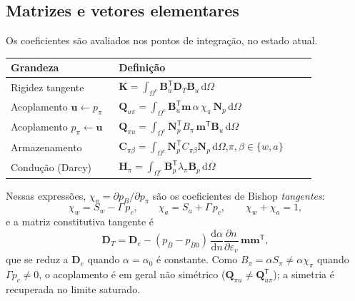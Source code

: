\documentclass[11pt,a4paper]{article}
\newcommand{\dd}{\mathrm{d}}
\begin{document}
\subsection{Matrizes e vetores elementares}

Os coeficientes são avaliados nos pontos de integração, no estado atual.
\begin{center}
\renewcommand{\arraystretch}{1.6}
\begin{tabular}{p{0.30\linewidth}p{0.55\linewidth}}
\toprule
Grandeza & Definição\\
\midrule
Rigidez tangente &
$\mathbf K=\displaystyle\int_{\Omega^e}\mathbf B_u^{\mathsf T}\mathbf D_T\mathbf B_u\,\dd\Omega$\\
Acoplamento $\mathbf u\leftarrow p_\pi$ &
$\mathbf Q_{u\pi}=\displaystyle\int_{\Omega^e}\mathbf B_u^{\mathsf T}\mathbf m\,\alpha\,\chi_\pi\,\mathbf N_p\,\dd\Omega$\\
Acoplamento $p_\pi\leftarrow\mathbf u$ &
$\mathbf Q_{\pi u}=\displaystyle\int_{\Omega^e}\mathbf N_p^{\mathsf T}B_\pi\,\mathbf m^{\mathsf T}\mathbf B_u\,\dd\Omega$\\
Armazenamento &
$\mathbf C_{\pi\beta}=\displaystyle\int_{\Omega^e}\mathbf N_p^{\mathsf T}C_{\pi\beta}\mathbf N_p\,\dd\Omega$,\quad $\pi,\beta\in\{w,a\}$\\
Condução (Darcy) &
$\mathbf H_\pi=\displaystyle\int_{\Omega^e}\mathbf B_p^{\mathsf T}\lambda_\pi\mathbf B_p\,\dd\Omega$\\
\bottomrule
\end{tabular}
\end{center}

Nessas expressões, $\chi_\pi=\partial p_B/\partial p_\pi$ são os
coeficientes de Bishop \emph{tangentes}:
\begin{equation*}
\boxed{\chi_w=S_w-\Gamma\,p_c,\qquad \chi_a=S_a+\Gamma\,p_c,\qquad \chi_w+\chi_a=1,}
\end{equation*}
e a matriz constitutiva tangente é
\begin{equation*}
\mathbf D_T=\mathbf D_e-(p_B-p_{B0})\,\frac{\dd\alpha}{\dd n}\frac{\partial n}{\partial\varepsilon_v}\,\mathbf m\mathbf m^{\mathsf T},
\end{equation*}
que se reduz a $\mathbf D_e$ quando $\alpha=\alpha_0$ é constante.
Como $B_\pi=\alpha S_\pi\neq\alpha\chi_\pi$ quando $\Gamma p_c\neq0$,
o acoplamento é em geral não simétrico ($\mathbf Q_{\pi u}\neq\mathbf Q_{u\pi}^{\mathsf T}$);
a simetria é recuperada no limite saturado.
\end{document}
